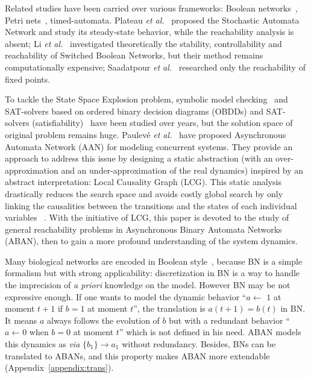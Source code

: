 \documentclass{article}
\newcommand{\ac}[3]{$\{#1\}\rightarrow#3$}
\theoremstyle{definition}
\begin{document}
Related studies have been carried over various frameworks: Boolean networks~\cite{akutsu2007control}, Petri nets~\cite{mayr1984,esparza1998}, timed-automata\cite{Daws1998,wozna2003}. 
Plateau \textit{et al.}~\cite{plateau1991stochastic} proposed the Stochastic Automata Network and study its steady-state behavior, while the reachability analysis is absent; 
Li \textit{et al.}~\cite{li2012reachability,li2014stability} investigated theoretically the stability, controllability and reachability of Switched Boolean Networks, but their method remains computationally expensive;
Saadatpour \textit{et al.}~\cite{saadatpour2010attractor} researched only the reachability of fixed points.

To tackle the State Space Explosion problem, symbolic model checking~\cite{burch1992symbolic} and SAT-solvers based on ordered binary decision diagrams (OBDDs) and SAT-solvers (satisfiability)~\cite{abdulla2000symbolic} have been studied over years, but the solution space of original problem remains huge.
Paulev\'e \textit{et al.}~\cite{folschette2015,pauleve2011} have proposed Asynchronous Automata Network (AAN) for modeling concurrent systems.
They provide an approach to address this issue by designing a static abstraction (with an over-approximation and an under-approximation of the real dynamics) inspired by an abstract interpretation: Local Causality Graph (LCG).
This static analysis drastically reduces the search space and avoids costly global search by only linking the causalities between the transitions and the states of each individual variables ~\cite{pauleve2012}.
With the initiative of LCG, this paper is devoted to the study of general reachability problems in Asynchronous Binary Automata Networks (ABAN), then to gain a more profound understanding of the system dynamics. 

Many biological networks are encoded in Boolean style~\cite{akutsu2007control,kauffman1969}, because BN is a simple formalism but with strong applicability: discretization in BN is a way to handle the imprecision of \textit{a priori} knowledge on the model.
However BN may be not expressive enough.
If one wants to model the dynamic behavior ``$a\gets$ $1$ at moment $t+1$ if $b=1$ at moment $t$'', the translation is $a(t+1)=b(t)$ in BN.
It means $a$ always follows the evolution of $b$ but with a redundant behavior ``$a\gets 0$ when $b=0$ at moment $t$'' which is not defined in his need.
ABAN models this dynamics as \textit{via} \ac{b_1}{a_0}{a_1} without redundancy. 
Besides, BNs can be translated to ABANs, and this property makes ABAN more extendable (Appendix~\ref{appendix:trans}).
\end{document}
